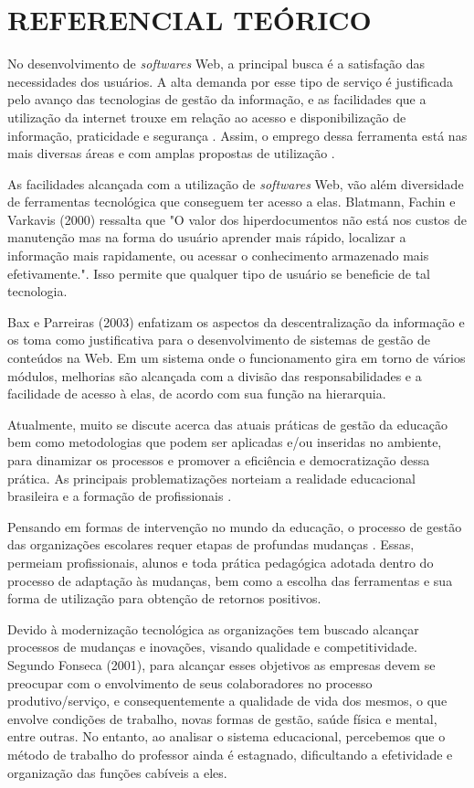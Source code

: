 \chapter{REFERENCIAL TEÓRICO}
\label{cap:referencial}


No desenvolvimento de \textit{softwares} Web, a principal busca é a satisfação das necessidades dos usuários. A alta demanda por esse tipo de serviço é justificada pelo avanço das tecnologias de gestão da informação, e as facilidades que a utilização da internet trouxe em relação ao acesso e disponibilização de informação, praticidade e segurança \cite{barbosa2009gestao}. Assim, o emprego dessa ferramenta está nas mais diversas áreas e com amplas propostas de utilização .

As facilidades alcançada com a utilização de \textit{softwares} Web, vão além diversidade de ferramentas tecnológica que conseguem ter acesso a elas. Blatmann, Fachin e Varkavis (2000) ressalta que  "O valor dos hiperdocumentos não está nos custos de manutenção mas na forma do usuário aprender mais rápido, localizar a informação mais rapidamente, ou acessar o conhecimento armazenado mais efetivamente.". Isso permite que qualquer tipo de usuário se beneficie de tal tecnologia.

Bax e Parreiras (2003) enfatizam os aspectos da descentralização da informação e os toma como justificativa para o desenvolvimento de sistemas de gestão de conteúdos na Web. Em um sistema onde o funcionamento gira em torno de vários módulos, melhorias são alcançada com a divisão das responsabilidades e a facilidade de acesso à elas, de acordo com sua função na hierarquia.

Atualmente, muito se discute acerca das atuais práticas de gestão da educação bem como metodologias que podem ser aplicadas e/ou inseridas no ambiente, para dinamizar os processos e promover a eficiência e democratização dessa prática. As principais problematizações norteiam a realidade educacional brasileira e a formação de profissionais \cite{paro2007gestao}.

Pensando em formas de intervenção no mundo da educação, o processo de gestão das organizações escolares requer etapas de profundas mudanças \cite{brito2006tecnologias}. Essas, permeiam profissionais, alunos e toda prática pedagógica adotada dentro do processo de adaptação às mudanças, bem como a escolha das ferramentas e sua forma de utilização para obtenção de retornos positivos.

Devido à modernização tecnológica as organizações tem buscado alcançar processos de mudanças e inovações, visando qualidade e competitividade. Segundo Fonseca (2001), para alcançar esses objetivos as empresas devem se preocupar com o envolvimento de seus colaboradores no processo produtivo/serviço, e consequentemente a qualidade de vida dos mesmos, o que envolve condições de trabalho, novas formas de gestão, saúde física e mental, entre outras. No entanto, ao analisar o sistema educacional, percebemos que o método de trabalho do professor ainda é estagnado, dificultando a efetividade e organização das funções cabíveis a eles.


